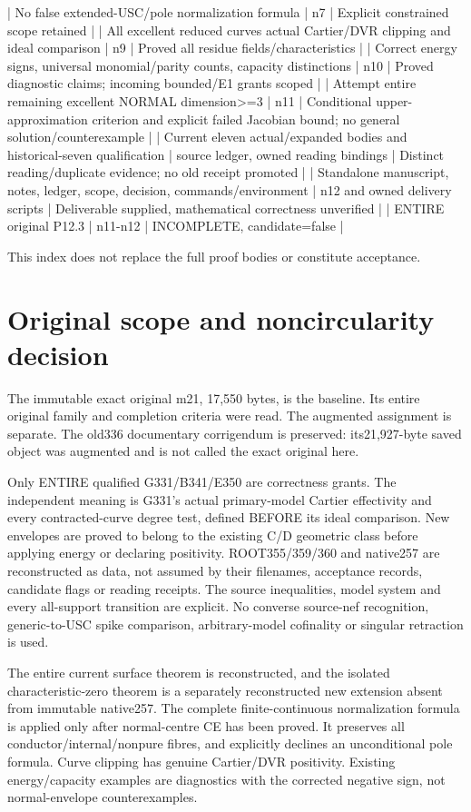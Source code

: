 \documentclass[11pt]{article}
\begin{document}
| No false extended-USC/pole normalization formula | n7 | Explicit constrained scope retained |
| All excellent reduced curves actual Cartier/DVR clipping and ideal comparison | n9 | Proved all residue fields/characteristics |
| Correct energy signs, universal monomial/parity counts, capacity distinctions | n10 | Proved diagnostic claims; incoming bounded/E1 grants scoped |
| Attempt entire remaining excellent NORMAL dimension>=3 | n11 | Conditional upper-approximation criterion and explicit failed Jacobian bound; no general solution/counterexample |
| Current eleven actual/expanded bodies and historical-seven qualification | source ledger, owned reading bindings | Distinct reading/duplicate evidence; no old receipt promoted |
| Standalone manuscript, notes, ledger, scope, decision, commands/environment | n12 and owned delivery scripts | Deliverable supplied, mathematical correctness unverified |
| ENTIRE original P12.3 | n11-n12 | INCOMPLETE, candidate=false |

This index does not replace the full proof bodies or constitute acceptance.


\section*{Original scope and noncircularity decision}

The immutable exact original m21, 17,550 bytes, is the baseline. Its entire original family and completion criteria were read. The augmented assignment is separate. The old336 documentary corrigendum is preserved: its21,927-byte saved object was augmented and is not called the exact original here.

Only ENTIRE qualified G331/B341/E350 are correctness grants. The independent meaning is G331's actual primary-model Cartier effectivity and every contracted-curve degree test, defined BEFORE its ideal comparison. New envelopes are proved to belong to the existing C/D geometric class before applying energy or declaring positivity. ROOT355/359/360 and native257 are reconstructed as data, not assumed by their filenames, acceptance records, candidate flags or reading receipts. The source inequalities, model system and every all-support transition are explicit. No converse source-nef recognition, generic-to-USC spike comparison, arbitrary-model cofinality or singular retraction is used.

The entire current surface theorem is reconstructed, and the isolated characteristic-zero theorem is a separately reconstructed new extension absent from immutable native257. The complete finite-continuous normalization formula is applied only after normal-centre CE has been proved. It preserves all conductor/internal/nonpure fibres, and explicitly declines an unconditional pole formula. Curve clipping has genuine Cartier/DVR positivity. Existing energy/capacity examples are diagnostics with the corrected negative sign, not normal-envelope counterexamples.
\end{document}
